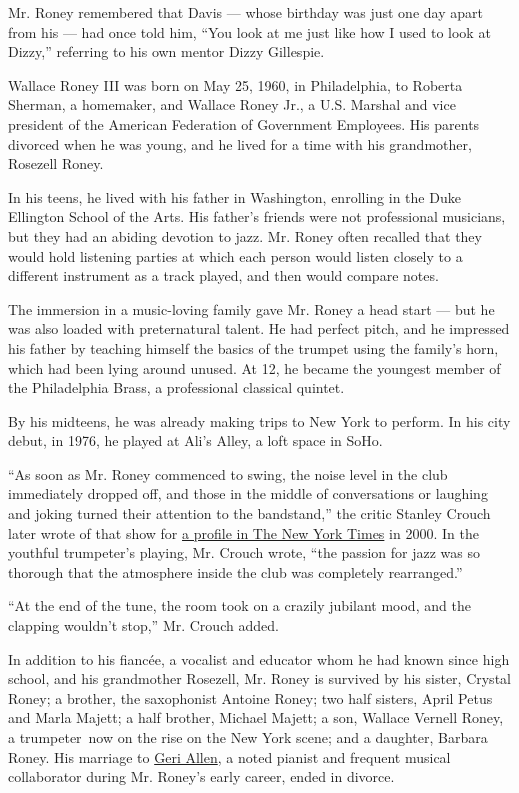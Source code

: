 Mr. Roney remembered that Davis --- whose birthday was just one day
apart from his --- had once told him, ``You look at me just like how I
used to look at Dizzy,'' referring to his own mentor Dizzy Gillespie.

Wallace Roney III was born on May 25, 1960, in Philadelphia, to Roberta
Sherman, a homemaker, and Wallace Roney Jr., a U.S. Marshal and vice
president of the American Federation of Government Employees. His
parents divorced when he was young, and he lived for a time with his
grandmother, Rosezell Roney.

In his teens, he lived with his father in Washington, enrolling in the
Duke Ellington School of the Arts. His father's friends were not
professional musicians, but they had an abiding devotion to jazz. Mr.
Roney often recalled that they would hold listening parties at which
each person would listen closely to a different instrument as a track
played, and then would compare notes.

The immersion in a music-loving family gave Mr. Roney a head start ---
but he was also loaded with preternatural talent. He had perfect pitch,
and he impressed his father by teaching himself the basics of the
trumpet using the family's horn, which had been lying around unused. At
12, he became the youngest member of the Philadelphia Brass, a
professional classical quintet.

By his midteens, he was already making trips to New York to perform. In
his city debut, in 1976, he played at Ali's Alley, a loft space in SoHo.

``As soon as Mr. Roney commenced to swing, the noise level in the club
immediately dropped off, and those in the middle of conversations or
laughing and joking turned their attention to the bandstand,'' the
critic Stanley Crouch later wrote of that show for
\href{https://www.nytimes.com/2000/09/24/arts/music-don-t-ask-the-critics-ask-wallace-roney-s-peers.html}{a
profile in The New York Times} in 2000. In the youthful trumpeter's
playing, Mr. Crouch wrote, ``the passion for jazz was so thorough that
the atmosphere inside the club was completely rearranged.''

``At the end of the tune, the room took on a crazily jubilant mood, and
the clapping wouldn't stop,'' Mr. Crouch added.

In addition to his fiancée, a vocalist and educator whom he had known
since high school, and his grandmother Rosezell, Mr. Roney is survived
by his sister, Crystal Roney; a brother, the saxophonist Antoine Roney;
two half sisters, April Petus and Marla Majett; a half brother, Michael
Majett; a son, Wallace Vernell Roney, a trumpeter~now on the rise on the
New York scene; and a daughter, Barbara Roney. His marriage to
\href{https://www.nytimes.com/2017/06/27/arts/music/geri-allen-dead-jazz.html}{Geri
Allen}, a noted pianist and frequent musical collaborator during Mr.
Roney's early career, ended in divorce.

